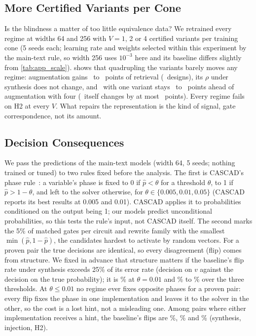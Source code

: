 \subsection{More Certified Variants per Cone}\label{app:datascale}
\begin{table}[h]
\centering\scriptsize
\caption{Data scale: restructured retrieval and $\rho$ under synthesis with $V$ certified variants per training cone
(5 seeds each). The baseline trains without variants.}
\label{tab:app_datascale}
\resizebox{\columnwidth}{!}{}
\end{table}
Is the blindness a matter of too little equivalence data? We retrained every regime at widths 64 and 256 with $V=1$,
2 or 4 certified variants per training cone (5 seeds each; learning rate and weights selected within this experiment
by the main-text rule, so width 256 uses $10^{-3}$ here and its baseline differs slightly from \cref{tab:app_scale}).
 shows that quadrupling the variants barely moves any regime: augmentation gains
\EFourAugGainMin\ to \EFourAugGainMax\ points of retrieval (\EFourAugBetter\ designs), its $\rho$ under synthesis does
not change, and \ours\ with one variant stays \EFourGapMin\ to \EFourGapMax\ points ahead of augmentation with four
(\ours\ itself changes by at most \EFourOursChangeMax\ points). Every regime fails on H2 at every $V$. What
repairs the representation is the kind of signal, gate correspondence, not its amount.

\subsection{Decision Consequences}\label{app:decisions}
We pass the predictions of the main-text models (width 64, 5 seeds; nothing trained or tuned) to two rules fixed before
the analysis. The first is CASCAD's phase rule~\cite{DBLP:journals/corr/abs-2508-04235}: a variable's phase is fixed to 0 if $\hat p<\theta$ for a threshold $\theta$, to 1
if $\hat p>1-\theta$, and left to the solver otherwise, for $\theta\in\{0.005,0.01,0.05\}$ (CASCAD reports its best results
at 0.005 and 0.01). CASCAD applies it to probabilities conditioned on the output being 1; our models predict unconditional
probabilities, so this tests the rule's input, not CASCAD itself. The second marks the 5\% of matched gates per circuit
and rewrite family with the smallest $\min(\hat p,1-\hat p)$, the candidates hardest to activate by random vectors. For a
proven pair the true decisions are identical, so every disagreement (flip) comes from structure. We fixed in advance that
structure matters if the baseline's flip rate under synthesis exceeds 25\% of its error rate (decision on $v$ against
the decision on the true probability); it is \DecRatioSyn\% at $\theta=0.01$ and \DecRatioMin\% to \DecRatioMax\% over the three
thresholds. At $\theta\le0.01$ no regime ever fixes opposite phases for a proven pair: every flip fixes the phase in one
implementation and leaves it to the solver in the other, so the cost is a lost hint, not a misleading one. Among pairs
where either implementation receives a hint, the baseline's flips are \DecCFlipSyn\%, \DecCFlipInj\% and \DecCFlipHTwo\%
(synthesis, injection, H2).

